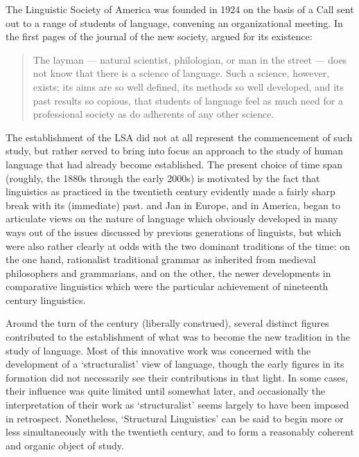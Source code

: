 The {Linguistic Society of America} was founded in 1924 on the basis of
a Call sent out to a range of students of language, convening an
organizational meeting. In the first pages of the journal of the new
society,  argued for its existence:
\begin{quotation}
  The layman --- natural scientist, philologian, or man in the street
  --- does not know that there is a science of language.  Such a
  science, however, exists; its aims are so well defined, its methods
  so well developed, and its past results so copious, that students of
  language feel as much need for a professional society as do
  adherents of any other science. \\
  \citep[1]{bloomfield1925:why.lsa}
\end{quotation}

The establishment of the LSA did not at all represent the commencement
of such study, but rather served to bring into focus an approach to
the study of human language that had already become established.  The
present choice of time span (roughly, the 1880s through the early
2000s) is motivated by the fact that linguistics as practiced in the
twentieth century evidently made a fairly sharp break with its
(immediate) past.   and Jan {\DeCourtenay}
in Europe, and  in America, began to articulate views on the
nature of language which obviously developed in many ways out of the
issues discussed by previous generations of linguists, but which were
also rather clearly at odds with the two dominant traditions of the
time: on the one hand, rationalist traditional grammar as inherited
from medieval philosophers and grammarians, and on the other, the
newer developments in comparative linguistics which were the
particular achievement of nineteenth century linguistics.

Around the turn of the century (liberally construed), several distinct
figures contributed to the establishment of what was to become the new
tradition in the study of language.  Most of this innovative work was
concerned with the development of a `structuralist' view of language,
though the early figures in its formation did not necessarily see
their contributions in that light.  In some cases, their influence was
quite limited until somewhat later, and occasionally the
interpretation of their work as `structuralist' seems largely to have
been imposed in retrospect. Nonetheless, `Structural Linguistics' can
be said to begin more or less simultaneously with the twentieth
century, and to form a reasonably coherent and organic object of
study.

